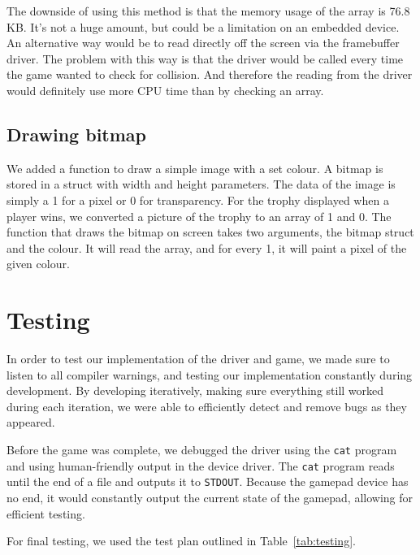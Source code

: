 The downside of using this method is that the memory usage of the array is 76.8 KB. It's not a huge amount, but could be a limitation on an embedded device. An alternative way would be to read directly off the screen via the framebuffer driver. The problem with this way is that the driver would be called every time the game wanted to check for collision. And therefore the reading from the driver would definitely use more CPU time than by checking an array.

\subsection{Drawing bitmap}
We added a function to draw a simple image with a set colour. A bitmap is stored in a struct with width and height parameters. The data of the image is simply a 1 for a pixel or 0 for transparency. For the trophy displayed when a player wins, we converted a picture of the trophy to an array of 1 and 0. The function that draws the bitmap on screen takes two arguments, the bitmap struct and the colour. It will read the array, and for every 1, it will paint a pixel of the given colour.

\section{Testing}
In order to test our implementation of the driver and game, we made sure to listen to all compiler warnings, and testing our implementation constantly during development. By developing iteratively, making sure everything still worked during each iteration, we were able to efficiently detect and remove bugs as they appeared.

Before the game was complete, we debugged the driver using the \texttt{cat} program and using human-friendly output in the device driver. The \texttt{cat} program reads until the end of a file and outputs it to \texttt{STDOUT}. Because the gamepad device has no end, it would constantly output the current state of the gamepad, allowing for efficient testing.

For final testing, we used the test plan outlined in Table~\ref{tab:testing}.

